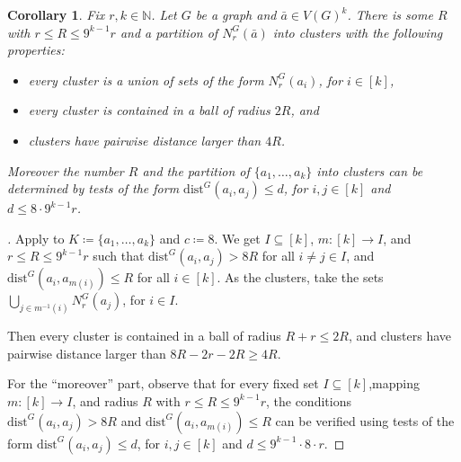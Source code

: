 \documentclass[11pt]{article}
\newcommand{\eqdef}{\coloneqq}
\newtheorem{corollary}[theorem]{Corollary}
\renewcommand{\qedsymbol}{\raisebox{0.2ex}{\scalebox{0.85}{$\blacksquare$}}}
\newenvironment{claimproof}[1][\proofname]{%
  \renewcommand{\qedsymbol}{\raisebox{0.3ex}{\scalebox{1}{$\blacktriangleleft$}}}%
  \begin{proof}[#1]%
}{%
  \end{proof}%
}
\theoremstyle{remark}
\newcommand{\set}[1]{\{#1\}}
\def\N{\mathbb N}
\renewcommand{\subset}{\subseteq}
\renewcommand{\le}{\leqslant}
\renewcommand{\ge}{\geqslant}
\newcommand{\dist}{\mathrm{dist}}
\newcommand{\tup}{\bar}
\begin{document}
\begin{corollary}\label{cor:clusters}
    Fix $r,k\in\N$.
    Let \(G\) be a graph and \(\bar a\in V(G)^k\). There is some $R$ with \(r \le R \le 9^{k-1} r\)
    and a partition of $N_r^G(\tup a)$ into \emph{clusters} with the following properties:
    \begin{itemize}
        \item every cluster is a union of sets of the form $N_r^G(a_i)$, for $i\in [k]$,
        \item every cluster is contained in a ball of radius \(2R\), and
        \item clusters have pairwise distance larger than \(4R\).
    \end{itemize}
    Moreover the number $R$
    and the partition of  $\set{a_1,\ldots, a_k}$ into clusters
    can be determined by tests of the form $\dist^G(a_i,a_j)\le d$, for $i,j\in[k]$ and $d\le 8\cdot 9^{k-1} r$.
\end{corollary}
\begin{claimproof}
        Apply
           to \(K\eqdef\set{a_1,\ldots,a_k}\) and $c\eqdef 8$.
          We get \(I \subseteq [k]\), \(m : [k] \to I\), and  \(r \le R \le 9^{k-1} r\) such that
        \(\dist^G(a_i,a_j) > 8 R\) for all \(i\neq j \in I\), and
        \(\dist^G(a_i,a_{m(i)}) \le R\) for all \(i \in [k]\).
        As the clusters, take the sets \(\bigcup_{j \in m^{-1}(i)} N^G_r(a_j) \), for $i\in I$.

        Then every cluster is contained in a ball of radius \(R+r \le 2R\),
and clusters have pairwise distance larger than \(8R-2r-2R \ge 4R\).

For the ``moreover'' part, observe that for every fixed set $I\subset [k]$,mapping $m:[k]\to I$, and radius $R$ with $r\le R\le 9^{k-1} r$,
the conditions
\(\dist^G(a_i,a_j) > 8 R\)
        and \(\dist^G(a_i,a_{m(i)}) \le R\) can be verified
using tests of the form $\dist^G(a_i,a_j)\le d$, for $i,j\in[k]$ and $d\le 9^{k-1}\cdot 8\cdot r$.
\end{claimproof}

\end{document}
